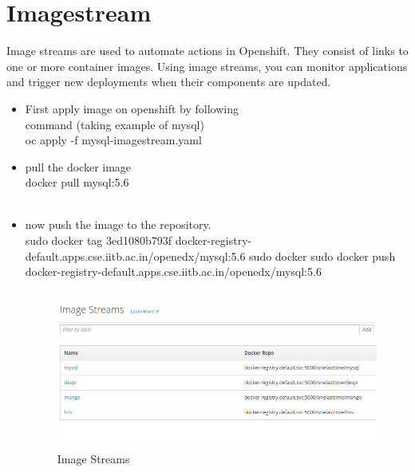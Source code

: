 \documentclass[11pt]{report}
\begin{document}
	\section{Imagestream}
	Image streams are used to automate actions in Openshift. They consist of links to one or more container images. Using image streams, you can monitor applications and trigger new deployments when their components are updated.
	\begin{itemize}
		\item  First apply image on openshift by following 
		\\
		command (taking example of mysql)
		\\
		oc apply -f mysql-imagestream.yaml
		\vspace{0.5cm}
		\\
		\item pull the docker image
		\\
		docker pull mysql:5.6
		\\
		\vspace{0.5cm}
		\\
		\item now push the image to the repository.
		\\
		sudo docker tag 3ed1080b793f docker-registry-default.apps.cse.iitb.ac.in/openedx/mysql:5.6
		sudo docker sudo docker push docker-registry-default.apps.cse.iitb.ac.in/openedx/mysql:5.6
		\ \\
		\ \\
		\large
		\begin{figure}[h!]
    	\begin{center}
    	   		\includegraphics[scale=0.5]{imagelist.png}
    		\caption{Image Streams}
    	  \end{center}
	  

\end{figure}
\end{itemize}
\end{document}
